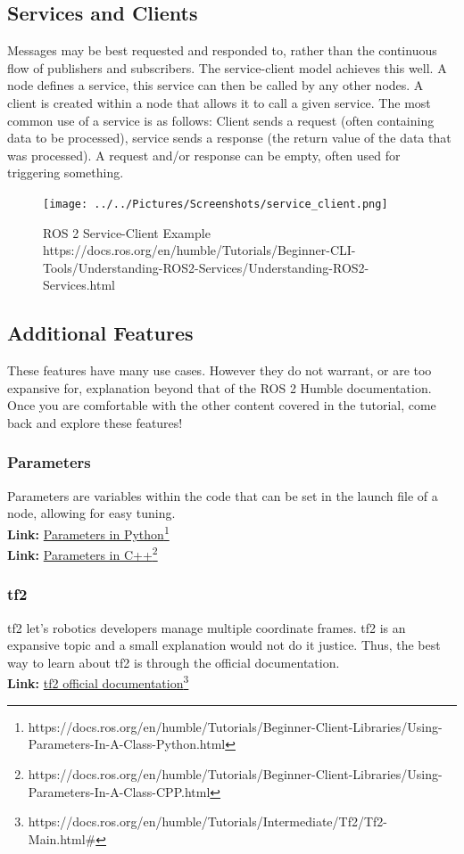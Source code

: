 \documentclass[11pt]{article}
\newcommand{\link}[2]{\textbf{Link: }\textcolor{blue}{\href{#2}{#1}}\footnote{#2}}
\begin{document}
\subsection{Services and Clients}
Messages may be best requested and responded to, rather than the continuous flow of publishers and subscribers. The service-client model achieves this well. A node defines a service, this service can then be called by any other nodes. A client is created within a node that allows it to call a given service. The most common use of a service is as follows: Client sends a request (often containing data to be processed), service sends a response (the return value of the data that was processed). A request and/or response can be empty, often used for triggering something. \\

\begin{figure}[hbtp]
\centering
\texttt{[image: ../../Pictures/Screenshots/service\_client.png]}
\caption{ROS 2 Service-Client Example\\ https://docs.ros.org/en/humble/Tutorials/Beginner-CLI-Tools/Understanding-ROS2-Services/Understanding-ROS2-Services.html}
\end{figure}
\pagebreak



\subsection{Additional Features}
These features have many use cases. However they do not warrant, or are too expansive for, explanation beyond that of the ROS 2 Humble documentation. Once you are comfortable with the other content covered in the tutorial, come back and explore these features!
\subsubsection{Parameters}
Parameters are variables within the code that can be set in the launch file of a node, allowing for easy tuning.\\
\link{Parameters in Python}{https://docs.ros.org/en/humble/Tutorials/Beginner-Client-Libraries/Using-Parameters-In-A-Class-Python.html}\\
\link{Parameters in C++}{https://docs.ros.org/en/humble/Tutorials/Beginner-Client-Libraries/Using-Parameters-In-A-Class-CPP.html}\\
\subsubsection{tf2}
tf2 let's robotics developers manage multiple coordinate frames. tf2 is an expansive topic and a small explanation would not do it justice. Thus, the best way to learn about tf2 is through the official documentation.\\
\link{tf2 official documentation}{https://docs.ros.org/en/humble/Tutorials/Intermediate/Tf2/Tf2-Main.html\#}\\
\end{document}
